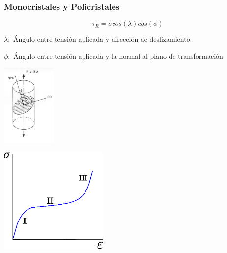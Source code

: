 \documentclass[usenames,dvipsnames]{beamer}
\begin{document}
\begin{frame}
\frametitle{Monocristales y Policristales} 
\begin{multicols}{2}
 \begin{center}
 \begin{equation*}
 \tau_{R}= \sigma cos(\lambda)cos(\phi)
\end{equation*}
\begin{tiny}

$\lambda:$ Ángulo entre tensión aplicada y dirección de deslizamiento

$\phi:$ Ángulo entre tensión aplicada y la normal al plano de transformación

\end{tiny}

\includegraphics[width=0.2\textwidth]{img/intro/tension.png}
 
 
 \includegraphics[width=0.4\textwidth]{img/intro/SigmavsDefPoli.eps}
 \end{center}
 \end{multicols}
 
\end{frame}


% 
% 
% 

 
\end{document}
